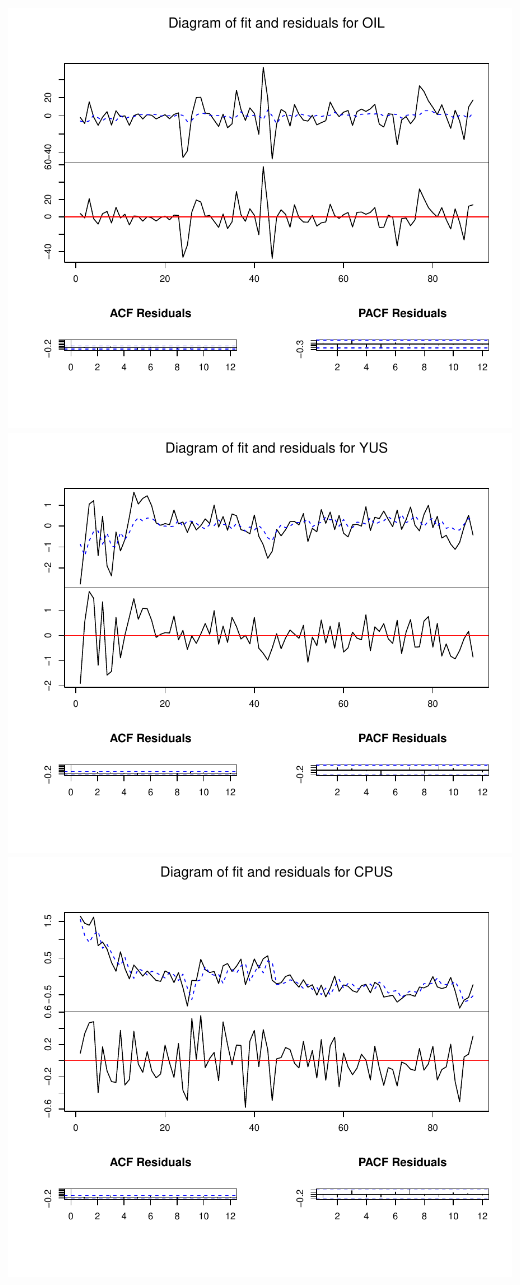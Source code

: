 \documentclass[11pt,preprint, authoryear]{elsarticle}
\numberwithin{equation}{section}
\numberwithin{figure}{section}
\numberwithin{table}{section}
\begin{document}
\includegraphics{replication_files/figure-latex/unnamed-chunk-5-1.pdf}
\includegraphics{replication_files/figure-latex/unnamed-chunk-5-2.pdf}
\includegraphics{replication_files/figure-latex/unnamed-chunk-5-3.pdf}
\end{document}
